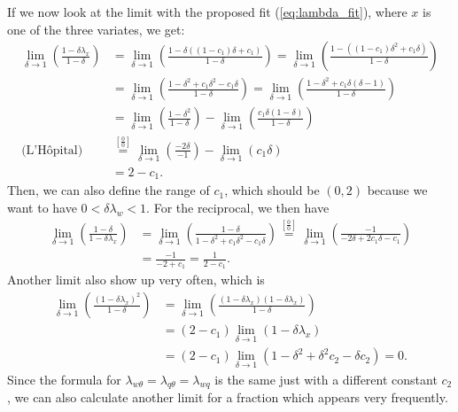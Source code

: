 If we now look at the limit with the proposed fit (\cref{eq:lambda_fit}),
where $x$ is one of the three variates, we get:
\begin{align}
    \lim_{\delta \to 1} \left(\frac{1 - \delta\lambda_x}{1 - \delta}\right)
    &= \lim_{\delta \to 1} \left(\frac{1 - \delta((1 - c_1) \delta + c_1)}{1 - \delta}\right)
    = \lim_{\delta \to 1} \left(\frac{1 - ((1 - c_1) \delta^2 + c_1\delta)}{1 - \delta}\right) \\
    &= \lim_{\delta \to 1} \left(\frac{1 - \delta^2 + c_1\delta^2 - c_1\delta}{1 - \delta}\right)
    = \lim_{\delta \to 1} \left(\frac{1 - \delta^2 + c_1\delta(\delta - 1)}{1 - \delta}\right) \\
    &= \lim_{\delta \to 1} \left(\frac{1 - \delta^2}{1 - \delta}\right)
    - \lim_{\delta \to 1} \left(\frac{c_1\delta(1 - \delta)}{1 - \delta}\right) \\
    \text{(L'Hôpital)}
    &\overset{\left[\frac{0}{0}\right]}{=} \lim_{\delta \to 1} \left(\frac{-2\delta}{-1}\right)
    - \lim_{\delta \to 1} \left(c_1\delta\right) \\
    &= 2 - c_1.
\end{align}
Then, we can also define the range of $c_1$,
which should be $(0, 2)$ because we want to have $0 < \delta\lambda_w < 1$.
For the reciprocal, we then have
\begin{align}
    \lim_{\delta \to 1} \left(\frac{1 - \delta}{1 - \delta\lambda_x}\right)
    &= \lim_{\delta \to 1} \left(\frac{1 - \delta}{1 - \delta^2 + c_1\delta^2 - c_1\delta}\right)
    \overset{\left[\frac{0}{0}\right]}{=} \lim_{\delta \to 1} \left(\frac{-1}{- 2\delta + 2c_1\delta - c_1}\right) \\
    &= \frac{-1}{-2 + c_1} = \frac{1}{2 - c_1}.
\end{align}
Another limit also show up very often, which is
\begin{align}
    \lim_{\delta \to 1} \left(\frac{(1 - \delta\lambda_x)^2}{1 - \delta}\right)
    &= \lim_{\delta \to 1} \left(\frac{(1 - \delta\lambda_x) (1 - \delta\lambda_x)}{1 - \delta}\right) \\
    &= (2 - c_1) \lim_{\delta \to 1} (1 - \delta \lambda_x) \\
    &= (2 - c_1) \lim_{\delta \to 1} (1 - \delta^2 + \delta^2 c_2 - \delta c_2) = 0.
\end{align}
Since the formula for $\lambda_{w\theta} = \lambda_{q\theta} = \lambda_{wq}$ is the same just with a different constant $c_2$,
we can also calculate another limit for a fraction which appears very frequently.
